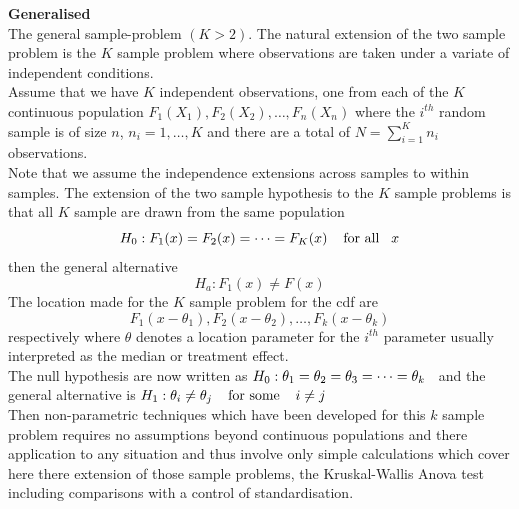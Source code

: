 \documentclass[11pt,a4paper]{article}
\theoremstyle{definition}
\begin{document}
\pagebreak
\textbf{Generalised}\\
The general sample-problem $(K>2)$. The natural extension of the two  sample problem is the $K$ sample problem where observations are taken under a variate of independent conditions.\\ 
Assume that we have $K$ independent observations, one from each of the $K$ continuous population $F_1(X_1), F_2(X_2),\dots, F_n(X_n)$ where the $i^{th}$ random sample is of size $n$, $n_i=1,\dots,K$ and there are a total of $N=\sum\limits^K_{i=1}n_i$ observations.\\ 
Note that we assume the independence extensions across samples to within samples. The extension of the two sample hypothesis to the $K$ sample problems is that all $K$ sample are drawn from the same population $$H_0:F_1(x)=F_2(x)=\dots=F_K(x)\hspace{0.4cm}\text{for all}\hspace{0.3cm} x$$ then the general alternative $$H_a:F_1(x)\neq F(x)$$
The location made for the $K$ sample problem for the cdf are $$F_1(x-\theta_1), F_2(x-\theta_2),\dots, F_k(x-\theta_k)$$ respectively where $\theta$ denotes a location parameter for the $i^{th}$ parameter usually interpreted as the median or treatment effect.\\ 
The null hypothesis are now written as \hspace{0.2cm}$H_0:\theta_1=\theta_2=\theta_3=\dots=\theta_k\hspace{0.2cm}$ and the general alternative is \hspace{0.2cm}$H_1:\theta_i\neq \theta_j\hspace{0.4cm}\text{for some}\hspace{0.4cm}i\neq j$\\
Then non-parametric techniques which have been developed for this $k$ sample problem requires no assumptions beyond continuous populations and there application to any situation and thus involve only simple calculations which cover here there extension of those sample problems, the Kruskal-Wallis Anova test including comparisons with a control of standardisation.\\\\
















\pagebreak
\pagebreak
\end{document}
